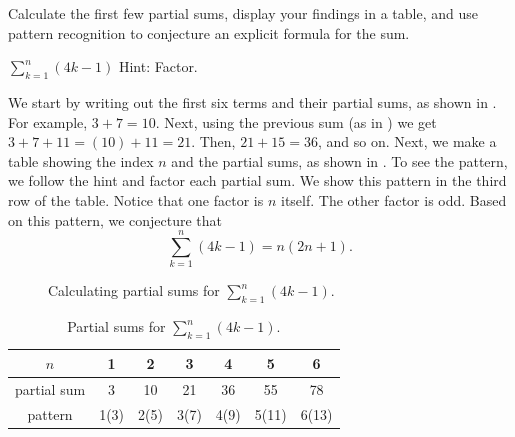 \begin{exam}
\label{exam_conj_explicit_sum_linear_exp}
    Calculate the first few partial sums, display your findings in a table, and use pattern recognition to conjecture an explicit formula for the sum.
        \begin{apart}
            \item $\displaystyle \sum_{k=1}^n(4k-1)$    Hint: Factor.
                \begin{soln}
                    We start by writing out the first six terms and their partial sums, as shown in .  For example, $3+7 = 10$.  Next, using the previous sum (as in ) we get $3+7+11 = (10) + 11 = 21$.  Then, $21 + 15 = 36$, and so on. 
                    Next, we make a table showing the index $n$ and the partial sums, as shown in .          
                    To see the pattern, we follow the hint and factor each partial sum.  We show this pattern in the third row of the table.  Notice that one factor is $n$ itself.  The other factor is odd.  Based on this pattern, we conjecture that $$\displaystyle \sum_{k=1}^n(4k-1)=n(2n+1).$$
                \end{soln}     
                
                \begin{figure}[hbtp]
                    \centering
                    \scalebox{0.75}{}  
                    \caption{Calculating partial sums for $\displaystyle \sum_{k=1}^n(4k-1)$.}
                    \label{fig_part_sums_linear}
                \end{figure}
                
                \begin{table}[hbtp]
                    \centering
                    \begin{tabular}{c|c|c|c|c|c|c}
                        $n$ & 1 & 2 & 3 & 4 & 5 & 6 \\ \hline
                        partial sum  & 3 & 10 & 21 & 36 & 55 & 78 \\ \hline  
                        pattern & 1(3) & 2(5) & 3(7) & 4(9) & 5(11) & 6(13) 
                    \end{tabular}
                    \caption{Partial sums for $\displaystyle \sum_{k=1}^n(4k-1)$.}
                    \label{tab_partial_sums_linear}
                \end{table}
                    

\end{apart}
\end{exam}
